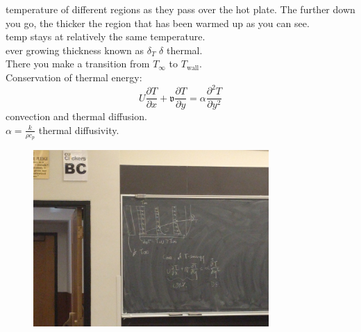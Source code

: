 \documentclass{article}
\begin{document}
temperature of different regions as they pass over the hot plate. The further down you go, the thicker the region that has been warmed up as you can see.\\
temp stays at relatively the same temperature.\\
ever growing thickness known as $\delta_T$ $\delta$ thermal.\\
There you make a transition from $T_\infty$ to $T_{\text{wall}}$.\\
Conservation of thermal energy:\\
\[U\frac{\partial T}{\partial x}+\mathfrak{v}\frac{\partial T}{\partial y}=\alpha \frac{\partial^2 T}{\partial y^2}\]
convection                    and thermal diffusion.\\
$\alpha=\frac{k}{\rho c_p}$ thermal diffusivity.\\
\begin{figure}[h!]
    \centering
    \includegraphics[clip=true,trim={50cm 40cm 33cm 30cm},width=0.8\textwidth]{flow3.jpg}
\end{figure}
\end{document}
